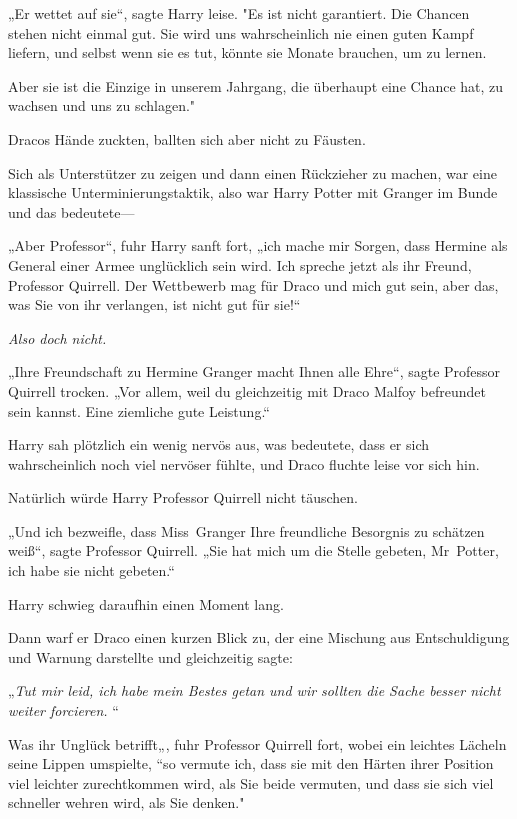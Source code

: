 {„Er wettet auf sie“, sagte Harry leise. "Es ist nicht garantiert. Die Chancen stehen nicht einmal gut. Sie wird uns wahrscheinlich nie einen guten Kampf liefern, und selbst wenn sie es tut, könnte sie Monate brauchen, um zu lernen.

Aber sie ist die Einzige in unserem Jahrgang, die überhaupt eine Chance hat, zu wachsen und uns zu schlagen."

Dracos Hände zuckten, ballten sich aber nicht zu Fäusten.

Sich als Unterstützer zu zeigen und dann einen Rückzieher zu machen, war eine klassische Unterminierungstaktik, also war Harry Potter mit Granger im Bunde und das bedeutete—

„Aber Professor“, fuhr Harry sanft fort, „ich mache mir Sorgen, dass Hermine als General einer Armee unglücklich sein wird. Ich spreche jetzt als ihr Freund, Professor Quirrell. Der Wettbewerb mag für Draco und mich gut sein, aber das, was Sie von ihr verlangen, ist nicht gut für sie!“

\emph{Also doch nicht.}

„Ihre Freundschaft zu Hermine Granger macht Ihnen alle Ehre“, sagte Professor Quirrell trocken. „Vor allem, weil du gleichzeitig mit Draco Malfoy befreundet sein kannst. Eine ziemliche gute Leistung.“

Harry sah plötzlich ein wenig nervös aus, was bedeutete, dass er sich wahrscheinlich noch viel nervöser fühlte, und Draco fluchte leise vor sich hin.

Natürlich würde Harry Professor Quirrell nicht täuschen.

„Und ich bezweifle, dass Miss~Granger Ihre freundliche Besorgnis zu schätzen weiß“, sagte Professor Quirrell. „Sie hat mich um die Stelle gebeten, Mr~Potter, ich habe sie nicht gebeten.“

Harry schwieg daraufhin einen Moment lang.

Dann warf er Draco einen kurzen Blick zu, der eine Mischung aus Entschuldigung und Warnung darstellte und gleichzeitig sagte:

„\emph{Tut mir leid, ich habe mein Bestes getan und wir sollten die Sache besser nicht weiter forcieren. }“

Was ihr Unglück betrifft„, fuhr Professor Quirrell fort, wobei ein leichtes Lächeln seine Lippen umspielte, “so vermute ich, dass sie mit den Härten ihrer Position viel leichter zurechtkommen wird, als Sie beide vermuten, und dass sie sich viel schneller wehren wird, als Sie denken."

}

